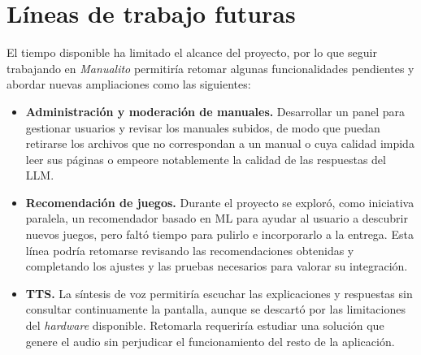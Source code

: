 \section{Líneas de trabajo futuras}
\label{conclusiones:trabajo-futuro}

El tiempo disponible ha limitado el alcance del proyecto, por lo que seguir
trabajando en \textit{Manualito} permitiría retomar algunas funcionalidades
pendientes y abordar nuevas ampliaciones como las siguientes:

\begin{itemize}
    \item \textbf{Administración y moderación de manuales.} Desarrollar
    un panel para gestionar usuarios y revisar los manuales subidos, de
    modo que puedan retirarse los archivos que no correspondan a un manual
    o cuya calidad impida leer sus páginas o empeore notablemente la calidad de las respuestas del \ac{LLM}.

    \item \textbf{Recomendación de juegos.} Durante el proyecto se exploró,
    como iniciativa paralela, un recomendador basado en \ac{ML} para ayudar
    al usuario a descubrir nuevos juegos, pero faltó tiempo para pulirlo
    e incorporarlo a la entrega. Esta línea podría
    retomarse revisando las recomendaciones obtenidas y completando los
    ajustes y las pruebas necesarios para valorar su integración.

    \item \textbf{\acs{TTS}.} La síntesis de voz permitiría
    escuchar las explicaciones y respuestas sin consultar continuamente la
    pantalla, aunque se descartó por las limitaciones del \textit{hardware}
    disponible. Retomarla requeriría estudiar una solución que genere el
    audio sin perjudicar el funcionamiento del resto de la aplicación.
\end{itemize}
